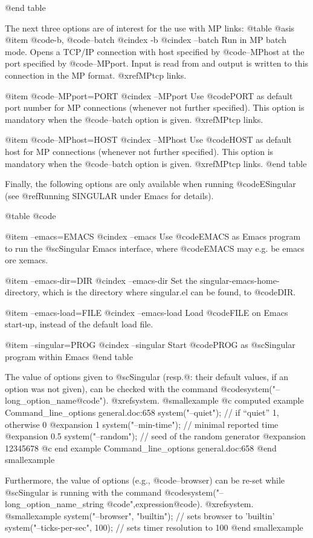 @end table

The next three options are of interest for the use with MP links:
@table @asis
@item @code{-b}, @code{--batch}
@cindex -b
@cindex --batch
Run in MP batch mode. Opens a TCP/IP connection with host specified by
@code{--MPhost} at the port specified by @code{--MPport}. Input is read
from and output is written to this connection in the MP format.
@xref{MPtcp links}.

@item @code{--MPport=PORT}
@cindex --MPport
Use @code{PORT} as default port number for MP connections (whenever not
further specified). This option is mandatory when the @code{--batch}
option is given.  @xref{MPtcp links}.

@item @code{--MPhost=HOST}
@cindex --MPhost
Use @code{HOST} as default host for MP connections (whenever not
further specified).  This option is mandatory when the @code{--batch}
option is given.  @xref{MPtcp links}.
@end table

Finally, the following options are only available when running
@code{ESingular} (see @ref{Running SINGULAR under Emacs} for details).

@table @code

@item --emacs=EMACS
@cindex --emacs
Use @code{EMACS} as Emacs program to run the @sc{Singular} Emacs
interface, where @code{EMACS} may e.g. be emacs ore xemacs.

@item --emacs-dir=DIR
@cindex --emacs-dir
Set the singular-emacs-home-directory, which is the directory where
singular.el can be found, to @code{DIR}.

@item --emacs-load=FILE
@cindex --emacs-load
Load @code{FILE} on Emacs start-up, instead of the default load file.

@item --singular=PROG
@cindex --singular
Start @code{PROG} as @sc{Singular} program within Emacs
@end table

The value of options given to @sc{Singular} (resp.@: their default values,
if an option was not given), can be checked with the command
@code{system("--}long_option_name@code{")}.  @xref{system}.
@smallexample
@c computed example Command_line_options general.doc:658 
  system("--quiet");    // if ``quiet'' 1, otherwise 0
@expansion{} 1
  system("--min-time"); // minimal reported time
@expansion{} 0.5
  system("--random");   // seed of the random generator
@expansion{} 12345678
@c end example Command_line_options general.doc:658
@end smallexample

Furthermore, the value of options (e.g., @code{--browser}) can be
re-set while @sc{Singular} is running with the command
@code{system("--}long_option_name_string @code{",}expression@code{)}. @xref{system}.
@smallexample
  system("--browser", "builtin");  // sets browser to 'builtin'
  system("--ticks-per-sec", 100);  // sets timer resolution to 100
@end smallexample


